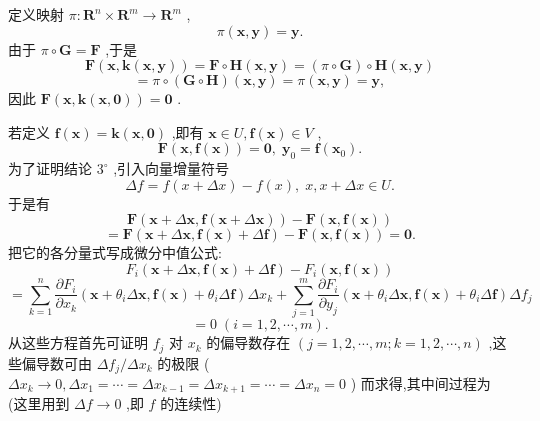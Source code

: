 定义映射 \(\pi  : {\mathbf{R}}^{n} \times  {\mathbf{R}}^{m} \rightarrow  {\mathbf{R}}^{m}\) ,
\[
\pi \left( {\mathbf{x},\mathbf{y}}\right)  = \mathbf{y}. \tag{21}
\]
由于 \(\pi  \circ  \mathbf{G} = \mathbf{F}\) ,于是
\[
\mathbf{F}\left( {\mathbf{x},\mathbf{k}\left( {\mathbf{x},\mathbf{y}}\right) }\right)  = \mathbf{F} \circ  \mathbf{H}\left( {\mathbf{x},\mathbf{y}}\right)  = \left( {\pi  \circ  \mathbf{G}}\right)  \circ  \mathbf{H}\left( {\mathbf{x},\mathbf{y}}\right)
\]
\[
= \pi  \circ  \left( {\mathbf{G} \circ  \mathbf{H}}\right) \left( {\mathbf{x},\mathbf{y}}\right)  = \pi \left( {\mathbf{x},\mathbf{y}}\right)  = \mathbf{y},
\]
因此 \(\mathbf{F}\left( {\mathbf{x},\mathbf{k}\left( {\mathbf{x},\mathbf{0}}\right) }\right)  = \mathbf{0}\) .

若定义 \(\mathbf{f}\left( \mathbf{x}\right)  = \mathbf{k}\left( {\mathbf{x},\mathbf{0}}\right)\) ,即有 \(\mathbf{x} \in  U,\mathbf{f}\left( \mathbf{x}\right)  \in  V\) ,
\[
\mathbf{F}\left( {\mathbf{x},\mathbf{f}\left( \mathbf{x}\right) }\right)  = \mathbf{0},\;{\mathbf{y}}_{0} = \mathbf{f}\left( {\mathbf{x}}_{0}\right) .
\]
为了证明结论 \({3}^{ \circ  }\) ,引入向量增量符号
\[
{\Delta f} = f\left( {x + {\Delta x}}\right)  - f\left( x\right) ,\;x,x + {\Delta x} \in  U.
\]
于是有
\[
\mathbf{F}\left( {\mathbf{x} + \Delta \mathbf{x},\mathbf{f}\left( {\mathbf{x} + \Delta \mathbf{x}}\right) }\right)  - \mathbf{F}\left( {\mathbf{x},\mathbf{f}\left( \mathbf{x}\right) }\right)
\]
\[
= \mathbf{F}\left( {\mathbf{x} + \Delta \mathbf{x},\mathbf{f}\left( \mathbf{x}\right)  + \Delta \mathbf{f}}\right)  - \mathbf{F}\left( {\mathbf{x},\mathbf{f}\left( \mathbf{x}\right) }\right)  = \mathbf{0}. \tag{22}
\]
把它的各分量式写成微分中值公式:
\[
{F}_{i}\left( {\mathbf{x} + \Delta \mathbf{x},\mathbf{f}\left( \mathbf{x}\right)  + \Delta \mathbf{f}}\right)  - {F}_{i}\left( {\mathbf{x},\mathbf{f}\left( \mathbf{x}\right) }\right)
\]
\[
= \mathop{\sum }\limits_{{k = 1}}^{n}\frac{\partial {F}_{i}}{\partial {x}_{k}}\left( {\mathbf{x} + {\theta }_{i}\Delta \mathbf{x},\mathbf{f}\left( \mathbf{x}\right)  + {\theta }_{i}\Delta \mathbf{f}}\right) \Delta {x}_{k} + \mathop{\sum }\limits_{{j = 1}}^{m}\frac{\partial {F}_{i}}{\partial {y}_{j}}\left( {\mathbf{x} + {\theta }_{i}\Delta \mathbf{x},\mathbf{f}\left( \mathbf{x}\right)  + {\theta }_{i}\Delta \mathbf{f}}\right) \Delta {f}_{j}
\]
\[
= 0\;\left( {i = 1,2,\cdots ,m}\right) . \tag{23}
\]
从这些方程首先可证明 \({f}_{j}\) 对 \({x}_{k}\) 的偏导数存在 \(\left( {j = 1,2,\cdots ,m;k = 1,2,\cdots ,n}\right)\) ,这些偏导数可由 \(\Delta {f}_{j}/\Delta {x}_{k}\) 的极限 ( \(\Delta {x}_{k} \rightarrow  0,\Delta {x}_{1} = \cdots  = \Delta {x}_{k - 1} = \Delta {x}_{k + 1} = \cdots  = \Delta {x}_{n} = 0\) ) 而求得,其中间过程为 (这里用到 \({\Delta f} \rightarrow  0\) ,即 \(f\) 的连续性)
